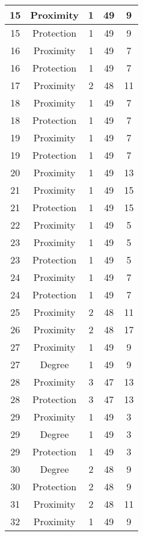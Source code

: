 \documentclass[results.tex]{subfiles}
\begin{document}
\begin{center}
\begin{tabular}{| c || c | c | c | c |}
    \hline
    15 & Proximity & 1 & 49 & 9 \\ 
    \hline
    15 & Protection & 1 & 49 & 9 \\ 
    \hline
    16 & Proximity & 1 & 49 & 7 \\ 
    \hline
    16 & Protection & 1 & 49 & 7 \\ 
    \hline
    17 & Proximity & 2 & 48 & 11 \\ 
    \hline
    18 & Proximity & 1 & 49 & 7 \\ 
    \hline
    18 & Protection & 1 & 49 & 7 \\ 
    \hline
    19 & Proximity & 1 & 49 & 7 \\ 
    \hline
    19 & Protection & 1 & 49 & 7 \\ 
    \hline
    20 & Proximity & 1 & 49 & 13 \\ 
    \hline
    21 & Proximity & 1 & 49 & 15 \\ 
    \hline
    21 & Protection & 1 & 49 & 15 \\ 
    \hline
    22 & Proximity & 1 & 49 & 5 \\ 
    \hline
    23 & Proximity & 1 & 49 & 5 \\ 
    \hline
    23 & Protection & 1 & 49 & 5 \\ 
    \hline
    24 & Proximity & 1 & 49 & 7 \\ 
    \hline
    24 & Protection & 1 & 49 & 7 \\ 
    \hline
    25 & Proximity & 2 & 48 & 11 \\ 
    \hline
    26 & Proximity & 2 & 48 & 17 \\ 
    \hline
    27 & Proximity & 1 & 49 & 9 \\ 
    \hline
    27 & Degree & 1 & 49 & 9 \\ 
    \hline
    28 & Proximity & 3 & 47 & 13 \\ 
    \hline
    28 & Protection & 3 & 47 & 13 \\ 
    \hline
    29 & Proximity & 1 & 49 & 3 \\ 
    \hline
    29 & Degree & 1 & 49 & 3 \\ 
    \hline
    29 & Protection & 1 & 49 & 3 \\ 
    \hline
    30 & Degree & 2 & 48 & 9 \\ 
    \hline
    30 & Protection & 2 & 48 & 9 \\ 
    \hline
    31 & Proximity & 2 & 48 & 11 \\ 
    \hline
    32 & Proximity & 1 & 49 & 9 \\ 

\end{tabular}
\end{center}
\end{document}
